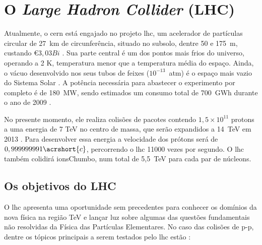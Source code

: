 \section{O \emph{Large Hadron Collider} (LHC)}
\label{sec:lhc}


Atualmente, o \gls{cern} está engajado no projeto \gls{lhc}, 
um acelerador de partículas circular de 27~km de
circunferência, situado no subsolo, dentre 50 e 175~m, custando \euro $3,03
Bi$ \cite{webLHC}. Sua parte central é um dos pontos mais frios do universo,
operando a 2 K, temperatura menor que a temperatura média do espaço. Ainda, o
vácuo desenvolvido nos seus tubos de feixes ($10^{-13}$~atm) é o espaço mais vazio do Sistema
Solar \cite{closerLook}. A potência necessária para abastecer o experimento por
completo é de 180~MW, sendo estimados um consumo total de 700~GWh durante o
ano de 2009 \cite{webLHC}. 

No presente momento, ele realiza colisões de pacotes contendo $1,5\times10^{11}$ \gls{protons} 
a uma energia de 7 TeV no centro de massa, que serão expandidos a 14~TeV em 2013
\cite{webATLAS}. Para desenvolver essa energia a velocidade dos prótons será de 
$0,999999991\acrshort{c}$, percorrendo o \gls{lhc} 11000 vezes por segundo.
O \gls{lhc} também colidirá \gls{ionsChumbo}, num total de 5,5~TeV para cada par
de núcleons.

\subsection{Os objetivos do LHC}
\label{ssec:obj_lhc}

O \gls{lhc} apresenta uma oportunidade sem precedentes para conhecer os domínios da
nova física na região TeV e lançar luz sobre algumas das questões fundamentais
não resolvidas da Física das Partículas Elementares.
No caso das colisões de p-p, dentre os tópicos principais a serem testados pelo
\gls{lhc} estão \cite{hunt_for_physics}:

